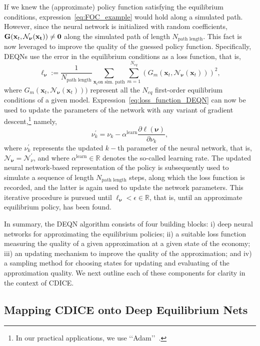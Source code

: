 \documentclass[11pt, a4paper, pdftex, twoside, dvipsnames]{article}
\newcommand{\nn}{\mathcal{N}_{\bm{\nu}}}
\newcommand{\lr}{\alpha^{\text{learn}}}
\newcommand{\x}{\mathbf{x}}
\begin{document}
\begin{appendices}
If we knew the (approximate) policy function satisfying the equilibrium conditions, expression~\eqref{eq:FOC_example} would hold along a simulated path. However, since the neural network is initialized with random coefficients, $\textbf{G}(\x_t, \nn(\bf{\x_t}))\neq 0$ along the simulated path of length $N_{\text{path length}}$. 
This fact is now leveraged to improve the quality of the guessed policy function. Specifically, DEQNs use the error in the equilibrium conditions as a loss function, that is,
%
\begin{equation}
\ell_{\bm{\nu}}:= \frac{1}{N_{\text{path length}}}\sum_{\x_t \text{on sim. path}}\sum_{m=1}^{N_{eq}}\left(G_{m}(\x_t, \nn(\x_t))\right)^2 ,
\label{eq:loss_function_DEQN}
\end{equation}
%
where $G_{m}(\x_t, \nn(\x_t)))$ represent all the $N_{eq}$ first-order equilibrium conditions of a given model.
Expression~\eqref{eq:loss_function_DEQN} can now be used to update the parameters of the network with any variant of gradient descent,\footnote{In our practical applications, we use \lq\lq Adam\rq\rq~\citep{kingma2014adam}.} namely,
%
\begin{equation}
  \nu^{'}_{k}=\nu_{k} - \lr \frac{\partial \ell(\bm{\nu})}{\partial \nu_{k}},
  \end{equation}
%
where $\nu^{'}_{k}$ represents the updated $k-$th parameter of the neural network, that is, $\nn = \mathcal{N}_{\nu}^{'}$, and where $\lr\in \mathbb{R}$ denotes the so-called learning rate. 
The updated neural network-based representation of the policy is subsequently used to simulate a sequence of length $N_{\text{path length}}$ steps, along which the loss function is recorded, and 
the latter is again used to update the network parameters. This iterative procedure is pursued until $\ell_{\bm{\nu}}< \epsilon\in \mathbb{R}$, that is, until an approximate equilibrium policy, has been found.

In summary, the DEQN algorithm consists of four building blocks: i) deep neural networks for approximating the equilibrium policies; ii) a suitable loss function measuring the quality of a given approximation at a given state of the economy; iii) an updating mechanism to improve the quality of the approximation; and iv) a sampling method for choosing states for updating and evaluating of the approximation quality. We next outline each of these components for clarity in the context of CDICE.

\subsection{Mapping CDICE onto Deep Equilibrium Nets}
\label{sec:CDICE_DEQN}


\end{appendices}
\end{document}
